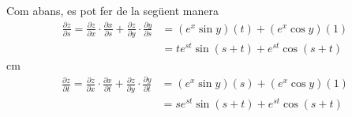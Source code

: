 \documentclass[12pt]{article}
\begin{document}
\vspace{0.4cm}
Com abans, es pot fer de la seg{\"u}ent manera
\begin{align*}
\frac{\partial z}{\partial s}=\frac{\partial z}{\partial x}
\cdot \frac{\partial x}{\partial s} + \frac{\partial z}{\partial
y} \cdot \frac{\partial y}{\partial s}  & = (e^x \sin y)(t) + (e^x
\cos y)(1) \\
& = t e^{s t}\sin (s+ t) +  e^{s t} \cos (s+ t)
\end{align*}
 cm
\vspace{0.4cm}\begin{align*}
\frac{\partial z}{\partial t}=\frac{\partial z}{\partial x}
\cdot \frac{\partial x}{\partial t} + \frac{\partial z}{\partial
y} \cdot \frac{\partial y}{\partial t} & = (e^x \sin y)(s) + (e^x
\cos y)(1) \\
& = s e^{s t}\sin (s+t) +  e^{s t} \cos (s+t)
\end{align*}
\end{document}
